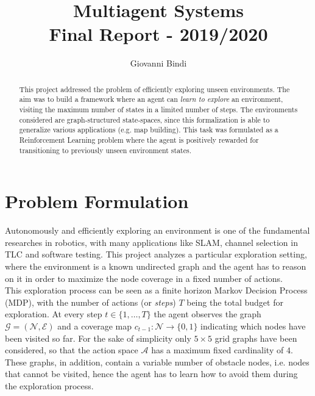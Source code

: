 \documentclass[a4paper]{article}
\begin{document}
\title{\textbf{\huge{Multiagent Systems}} \\ \vspace{0.5em} \Large{Final Report - 2019/2020}}
\author{\large{Giovanni Bindi}}
\date{}

\maketitle
\begin{abstract}
This project addressed the problem of efficiently exploring unseen environments. The aim was to build a framework where an agent can \textit{learn to explore} an environment, visiting the maximum number of states in a limited number of steps. The environments considered are graph-structured state-spaces, since this formalization is able to generalize various applications (e.g. map building). This task was formulated as a Reinforcement Learning problem where the agent is positively rewarded for transitioning to previously unseen environment states.
\end{abstract}\maketitle

\section{Problem Formulation}
Autonomously and efficiently exploring an environment is one of the fundamental researches in robotics, with many applications like SLAM, channel selection in TLC and software testing. This project analyzes a particular exploration setting, where the environment is a known undirected graph and the agent has to reason on it in order to maximize the node coverage in a fixed number of actions. \\
This exploration process can be seen as a finite horizon Markov Decision Process (MDP), with the number of actions (or \textit{steps}) $T$ being the total budget for exploration. At every step $t \in \{1, \dots, T\}$ the agent observes the graph $\mathcal{G} = (\mathcal{N}, \mathcal{E})$ and a coverage map $c_{t-1} : \mathcal{N} \to \{0, 1\}$ indicating which nodes have been visited so far. For the sake of simplicity only  $5 \times 5$ grid graphs have been considered, so that the action space $\mathcal{A}$ has a maximum fixed cardinality of $4$. These graphs, in addition, contain a variable number of obstacle nodes, i.e. nodes that cannot be visited, hence the agent has to learn how to avoid them during the exploration process.
\end{document}
